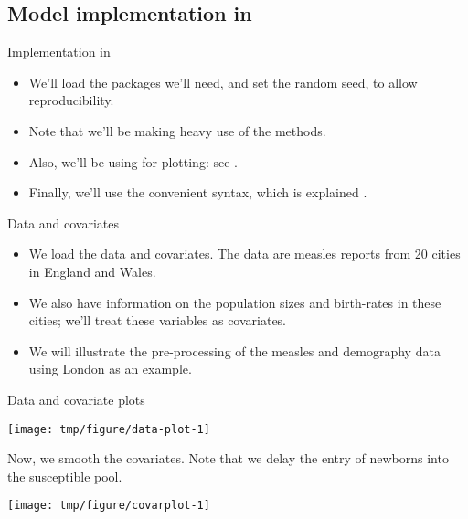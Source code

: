 \subsection{Model implementation in }

\begin{frame}[fragile]{Implementation in }
  \begin{itemize}
  \item We'll load the packages we'll need, and set the random seed, to allow reproducibility.
  \item Note that we'll be making heavy use of the  methods.
  \item Also, we'll be using  for plotting: see .
  \item Finally, we'll use the convenient  syntax, which is explained .
  \end{itemize}
\end{frame}

\begin{frame}[fragile]{Data and covariates}
  \begin{itemize}
  \item We load the data and covariates.
    The data are measles reports from 20 cities in England and Wales.
  \item We also have information on the population sizes and birth-rates in these cities;
    we'll treat these variables as covariates.
  \item We will illustrate the pre-processing of the measles and demography data using London as an example.
  \end{itemize}


\end{frame}

\begin{frame}[allowframebreaks]{Data and covariate plots}
\begin{knitrout}\small
{}\color{fgcolor}

{\centering \texttt{[image: tmp/figure/data-plot-1]} 

}


\end{knitrout}

  Now, we smooth the covariates. Note that we delay the entry of newborns into the susceptible pool.


\begin{knitrout}\small
{}\color{fgcolor}

{\centering \texttt{[image: tmp/figure/covarplot-1]} 

}


\end{knitrout}
\end{frame}


